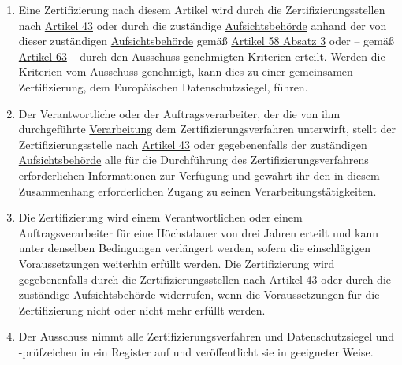 \begin{enumerate}
  \item Eine Zertifizierung nach diesem Artikel wird durch die Zertifizierungsstellen nach \hyperref[ch:43]{Artikel 43}
   oder durch die zuständige \hyperref[itm:04-21]{Aufsichtsbehörde} anhand der von dieser zuständigen \hyperref[itm:04-21]{Aufsichtsbehörde} gemäß \hyperref
   [itm:58-3]{Artikel 58 Absatz 3} oder -- gemäß \hyperref[ch:63]{Artikel 63} -- durch den Ausschuss genehmigten
   Kriterien erteilt. Werden die Kriterien vom Ausschuss genehmigt, kann dies zu einer gemeinsamen Zertifizierung, dem
   Europäischen Datenschutzsiegel, führen.
  \label{itm:42-5}

  \item Der Verantwortliche oder der Auftragsverarbeiter, der die von ihm durchgeführte \hyperref[itm:04-2]{Verarbeitung} dem
   Zertifizierungsverfahren unterwirft, stellt der Zertifizierungsstelle nach \hyperref[ch:43]{Artikel 43} oder
   gegebenenfalls der zuständigen \hyperref[itm:04-21]{Aufsichtsbehörde} alle für die Durchführung des Zertifizierungsverfahrens
   erforderlichen Informationen zur Verfügung und gewährt ihr den in diesem Zusammenhang erforderlichen Zugang zu
   seinen Verarbeitungstätigkeiten.
  \label{itm:42-6}

  \item Die Zertifizierung wird einem Verantwortlichen oder einem Auftragsverarbeiter für eine Höchstdauer von drei
   Jahren erteilt und kann unter denselben Bedingungen verlängert werden, sofern die einschlägigen Voraussetzungen
   weiterhin erfüllt werden. Die Zertifizierung wird gegebenenfalls durch die Zertifizierungsstellen nach \hyperref
   [ch:43]{Artikel 43} oder durch die zuständige \hyperref[itm:04-21]{Aufsichtsbehörde} widerrufen, wenn die Voraussetzungen für die
   Zertifizierung nicht oder nicht mehr erfüllt werden.
  \label{itm:42-7}

  \item Der Ausschuss nimmt alle Zertifizierungsverfahren und Datenschutzsiegel und -prüfzeichen in ein Register auf und
   veröffentlicht sie in geeigneter Weise.
  \label{itm:42-8}

\end{enumerate}


